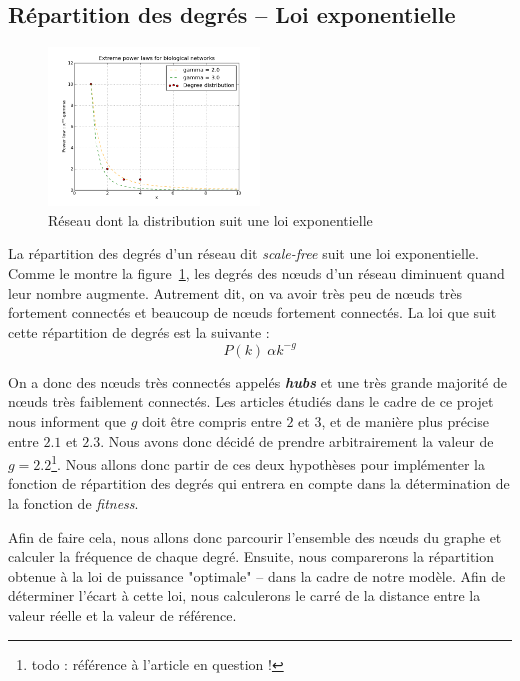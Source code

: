 \subsection{Répartition des degrés -- Loi exponentielle}
\begin{figure}
  \vspace{-30pt}
  \begin{center}
    \includegraphics[width=0.50\textwidth]{plot.png}
  \end{center}
  \caption{Réseau dont la distribution suit une loi exponentielle}
  \label{scalefree}
\end{figure}
La répartition des degrés d'un réseau dit \textit{scale-free} suit une loi exponentielle. Comme le montre la figure~\ref{scalefree}, les degrés des nœuds d'un réseau diminuent quand leur nombre augmente. Autrement dit, on va avoir très peu de nœuds très fortement connectés et beaucoup de nœuds fortement connectés. La loi que suit cette répartition de degrés est la suivante :
$$ P(k) ~ \alpha k^{-g} $$

On a donc des nœuds très connectés appelés \textit{\textbf{hubs}} et une très grande majorité de nœuds très faiblement connectés.	Les articles étudiés dans le cadre de ce projet nous informent que $g$ doit être compris entre $2$ et $3$, et de manière plus précise entre $2.1$ et $2.3$. Nous avons donc décidé de prendre arbitrairement la valeur de $g=2.2$\footnote{todo : référence à l'article en question !}. Nous allons donc partir de ces deux hypothèses pour implémenter la fonction de répartition des degrés qui entrera en compte dans la détermination de la fonction de \textit{fitness}.

Afin de faire cela, nous allons donc parcourir l'ensemble des nœuds du graphe et calculer la fréquence de chaque degré. Ensuite, nous comparerons la répartition obtenue à la loi de puissance "optimale" -- dans la cadre de notre modèle. Afin de déterminer l'écart à cette loi, nous calculerons le carré de la distance entre la valeur réelle et la valeur de référence.

